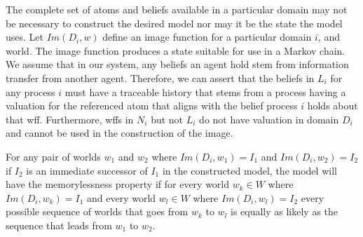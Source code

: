 The complete set of atoms and beliefs available in a particular domain may not be necessary to construct the desired model nor may it be the state the model uses. Let $Im(D_i, w)$ define an image function for a particular domain $i$, and world. The image function produces a state suitable for use in a Markov chain. We assume that in our system, any beliefs an agent hold stem from information transfer from another agent. Therefore, we can assert that the beliefs in $L_i$ for any process $i$ must have a traceable history that stems from a process having a valuation for the referenced atom that aligns with the belief process $i$ holds about that wff. Furthermore, wffs in $N_i$ but not $L_i$ do not have valuation in domain $D_i$ and cannot be used in the construction of the image.

\begin{thm}
For any pair of worlds $w_1$ and $w_2$ where $Im(D_i, w_1)=I_1$ and $Im(D_i, w_2)=I_2$ if $I_2$ is an immediate successor of $I_1$ in the constructed model, the model will have the memorylessness property if for every world $w_k \in W$ where $Im(D_i, w_k)=I_1$ and every world $w_l \in W$ where $Im(D_i, w_l)=I_2$ every possible sequence of worlds that goes from $w_k$ to $w_l$ is equally as likely as the sequence that leads from $w_1$ to $w_2$. 
\end{thm}

